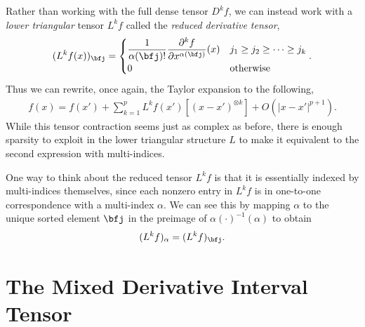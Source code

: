 \documentclass{article}
\theoremstyle{plain}
\theoremstyle{remark}
\begin{document}
Rather than working with the full dense tensor $D^kf$, we can instead work with a \emph{lower triangular} tensor $L^kf$ called the \emph{reduced derivative tensor},
\begin{align*}
    (L^kf (x))_{\bfj} = \begin{cases}
        \displaystyle \frac{1}{\alpha(\bfj)!} \frac{\partial^{k} f}{\partial x^{\alpha(\bfj)}}(x) & j_1 \geq j_2 \geq \cdots \geq j_k \\
        0 & \text{otherwise}
    \end{cases}.
\end{align*}
Thus we can rewrite, once again, the Taylor expansion to the following,
\begin{align*}
    f(x) = f(x') + \sum_{k=1}^p L^kf(x')[(x - x')^{\otimes k}] + O(|x - x'|^{p+1}).
\end{align*}
While this tensor contraction seems just as complex as before, there is enough sparsity to exploit in the lower triangular structure $L$ to make it equivalent to the second expression with multi-indices.

One way to think about the reduced tensor $L^kf$ is that it is essentially indexed by multi-indices themselves, since each nonzero entry in $L^kf$ is in one-to-one correspondence with a multi-index $\alpha$. 
We can see this by mapping $\alpha$ to the unique sorted element $\bfj$ in the preimage of $\alpha(\cdot)^{-1}(\alpha)$ to obtain
\begin{align*}
    (L^kf)_{\alpha} = (L^kf)_{\bfj}.
\end{align*}



\newpage

\section{The Mixed Derivative Interval Tensor}
\end{document}
